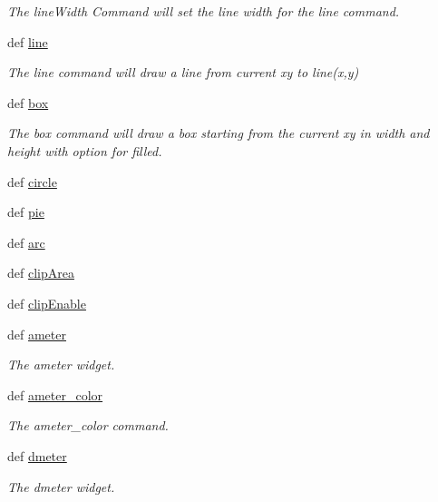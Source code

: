 \begin{DoxyCompactItemize}
\begin{DoxyCompactList}\small\item\em The line\-Width Command will set the line width for the line command. \end{DoxyCompactList}\item 
def \hyperlink{group___drawing_gae70c22a0a810a70a0dd6d32c9fd7c066}{line}
\begin{DoxyCompactList}\small\item\em The line command will draw a line from current xy to line(x,y) \end{DoxyCompactList}\item 
def \hyperlink{group___drawing_ga63bb01e1f5ef0fe2ae2acec0ed90e5bd}{box}
\begin{DoxyCompactList}\small\item\em The box command will draw a box starting from the current xy in width and height with option for filled. \end{DoxyCompactList}\item 
def \hyperlink{group___drawing_gabfcfb31f2d88c7397332abcc6b324c7c}{circle}
\item 
def \hyperlink{group___drawing_ga12fb93d2d6f7ce3f08ad988c09624d57}{pie}
\item 
def \hyperlink{group___drawing_ga13a0a8fb9c906a687f2a42864d973cc1}{arc}
\item 
def \hyperlink{group___drawing_ga2f55674143f1e4b06e42f09aaf0da71c}{clip\-Area}
\item 
def \hyperlink{group___drawing_gabd1433160288289495e6c006e77951e6}{clip\-Enable}
\item 
def \hyperlink{group___widgets_ga01020dc360dfbd9f463bf5478e42566e}{ameter}
\begin{DoxyCompactList}\small\item\em The ameter widget. \end{DoxyCompactList}\item 
def \hyperlink{group___widgets_ga87633e350f72285b45b9df28eff6ba18}{ameter\-\_\-color}
\begin{DoxyCompactList}\small\item\em The ameter\-\_\-color command. \end{DoxyCompactList}\item 
def \hyperlink{group___widgets_gaa521dbc7f8860a624135caaa58ba516d}{dmeter}
\begin{DoxyCompactList}\small\item\em The dmeter widget. \end{DoxyCompactList}\item 

\end{DoxyCompactItemize}
